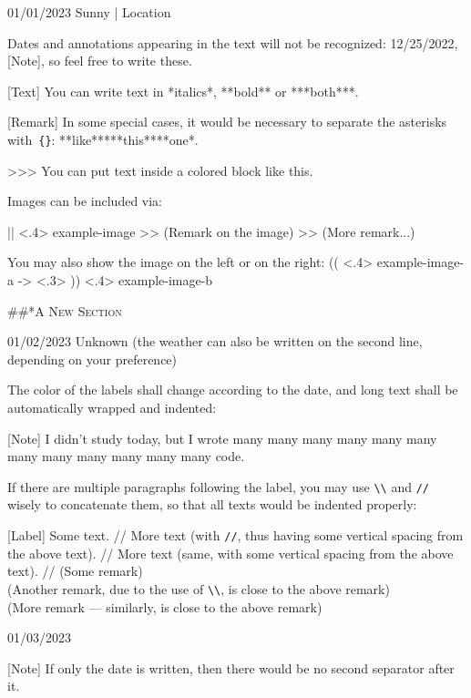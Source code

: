 \documentclass[11pt, paperstyle=light yellow, color entry, month-day-year,
  title in boldface, title in sffamily, use style = classical]{jwjournal}
\begin{document}
01/01/2023 Sunny | Location

  Dates and annotations appearing in the text will not be recognized: 12/25/2022, [Note], so feel free to write these.

  [Text] You can write text in *italics*, **bold** or ***both***.

  [Remark] In some special cases, it would be necessary to separate the asterisks with~\texttt{\{\}}: **like**{}***this***{}*one*.

  >>> You can put text inside a colored block like this.

  Images can be included via:

  || <.4> {example-image} %
  >> (Remark on the image)
  >> (More remark...)

  You may also show the image on the left or on the right:
  (( <.4> {example-image-a} %
  -> <.3> %
  )) <.4> {example-image-b} %


##*{\textsc{A New Section}}

01/02/2023
Unknown (the weather can also be written on the second line, depending on your preference)

  The color of the labels shall change according to the date, and long text shall be automatically wrapped and indented:

  [Note] I didn't study today, but I wrote many many many many many many many many many many many many code.

  If there are multiple paragraphs following the label, you may use \texttt{\textbackslash\textbackslash} and \texttt{\slash\slash} wisely to concatenate them, so that all texts would be indented properly:

  [Label] Some text.
    //
    More text (with \texttt{\slash\slash}, thus having some vertical spacing from the above text).
    //
    More text (same, with some vertical spacing from the above text).
    //
    (Some remark)
    \\
    (Another remark, due to the use of \texttt{\textbackslash\textbackslash}, is close to the above remark)
    \\
    (More remark --- similarly, is close to the above remark)



01/03/2023

  [Note] If only the date is written, then there would be no second separator after it.
\end{document}
